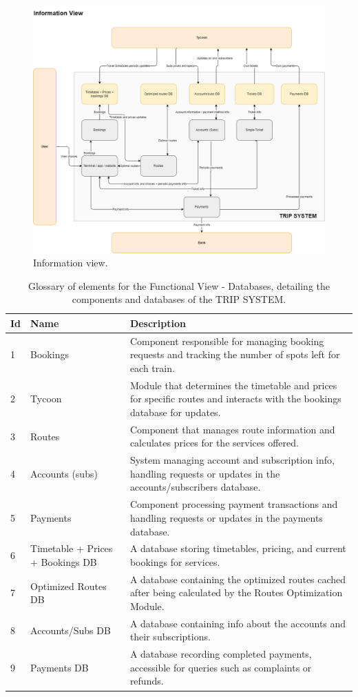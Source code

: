 \begin{figure}[H]
    \centering
    \includegraphics[width=\textwidth]{drawings/views_draft3/information_view.png}
    \caption{Information view.}
    \label{fig:information_view}
\end{figure}
\begin{table}[ht]
\centering
\begin{tabular}{@{}llp{10cm}@{}}
\toprule
\textbf{Id} & \textbf{Name} & \textbf{Description} \\
\midrule
1 & Bookings & Component responsible for managing booking requests and tracking the number of spots left for each train. \\
2 & Tycoon & Module that determines the timetable and prices for specific routes and interacts with the bookings database for updates. \\
3 & Routes & Component that manages route information and calculates prices for the services offered. \\
4 & Accounts (subs) & System managing account and subscription info, handling requests or updates in the accounts/subscribers database. \\
5 & Payments & Component processing payment transactions and handling requests or updates in the payments database. \\
6 & Timetable + Prices + Bookings DB & A database storing timetables, pricing, and current bookings for services. \\
7 & Optimized Routes DB & A database containing the optimized routes cached after being calculated by the Routes Optimization Module. \\
8 & Accounts/Subs DB & A database containing info about the accounts and their subscriptions. \\
9 & Payments DB & A database recording completed payments, accessible for queries such as complaints or refunds. \\
\bottomrule
\end{tabular}
\caption{Glossary of elements for the Functional View - Databases, detailing the components and databases of the TRIP SYSTEM.}
\label{tab:glossary_elements}
\end{table}

